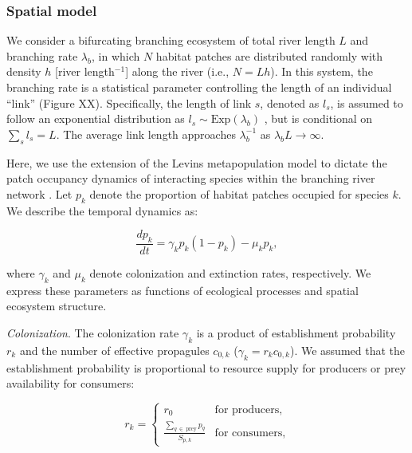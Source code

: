 \documentclass[11pt, class=article, crop=false]{standalone}
\begin{document}
\subsubsection{Spatial model}

We consider a bifurcating branching ecosystem of total river length $L$ and branching rate $\lambda_b$, in which $N$ habitat patches are distributed randomly with density $h$ [river length$^{-1}$] along the river (i.e., $N = Lh$).
In this system, the branching rate is a statistical parameter controlling the length of an individual ``link'' (Figure XX).
Specifically, the length of link $s$, denoted as $l_s$, is assumed to follow an exponential distribution as $l_s \sim \mbox{Exp}(\lambda_b)$ \citep{peckham_reformulation_1999, terui_metapopulation_2018, terui_emergent_2021}, but is conditional on $\sum_s l_s = L$.
The average link length approaches $\lambda_b^{-1}$ as $\lambda_b L \rightarrow \infty$.

Here, we use the extension of the Levins metapopulation model to dictate the patch occupancy dynamics of interacting species within the branching river network \citep{calcagno_constraints_2011, takimoto_effects_2012, guo_towards_2023}.
Let $p_k$ denote the proportion of habitat patches occupied for species $k$.
We describe the temporal dynamics as:

\begin{equation}
    \frac{dp_k}{dt} = \gamma_{k} p_k (1 - p_k) - \mu_k p_k,
\end{equation}

where $\gamma_k$ and $\mu_k$ denote colonization and extinction rates, respectively.
We express these parameters as functions of ecological processes and spatial ecosystem structure.

\textit{Colonization}. The colonization rate $\gamma_k$ is a product of establishment probability $r_k$ and the number of effective propagules $c_{0,k}$ ($\gamma_k = r_k c_{0,k}$).
We assumed that the establishment probability is proportional to resource supply for producers or prey availability for consumers:

\begin{equation}
    r_{k} = 
    \begin{cases}
        r_0 & \text{for producers,}\\
        \frac{\sum_{q~\in~\text{prey}} p_{q}}{S_{p,k}} & \text{for consumers,}
    \end{cases}
\end{equation}
\end{document}

